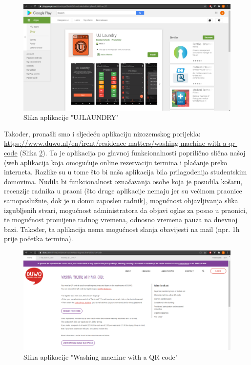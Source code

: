 			\begin{figure}[H]
				\includegraphics[width=.9\linewidth]{slike/UJLAUNDRY.PNG}
				\centering
				\caption{Slika aplikacije "UJLAUNDRY"}
				\label{fig:ujlaundry}
			\end{figure}
		
		
			{Također, pronašli smo i sljedeću aplikaciju nizozemskog porijekla: \url{https://www.duwo.nl/en/irent/residence-matters/washing-machine-with-a-qr-code} (Slika  \ref{fig:duwo}). Ta je aplikacija po glavnoj funkcionalnosti 
			poprilično slična našoj (web aplikacija koja omogućuje online rezervaciju termina i plaćanje preko
			interneta. Razlike su u tome što bi naša aplikacija bila prilagođenija studentskim domovima. Nudila bi
			funkcionalnost označavanja osobe koja je posudila košaru, recenzije radnika u praoni (što druge
			aplikacije nemaju jer su većinom praonice samoposlužnie, dok je u domu zaposlen radnik), mogućnost
			objavljivanja slika izgubljenih stvari, mogućnost administratora da objavi oglas za posao u praonici, te
			mogućnost promijene radnog vremena, odnosno vremena pauza na dnevnoj bazi. Također, ta aplikacija
			nema mogućnost slanja obavijesti na mail (npr. 1h prije početka termina).}
		
			\begin{figure}[H]
				\includegraphics[width=.9\linewidth]{slike/DUWO.PNG}
				\centering
				\caption{Slika aplikacije "Washing machine with a QR code"}
				\label{fig:duwo}
			\end{figure}
		
